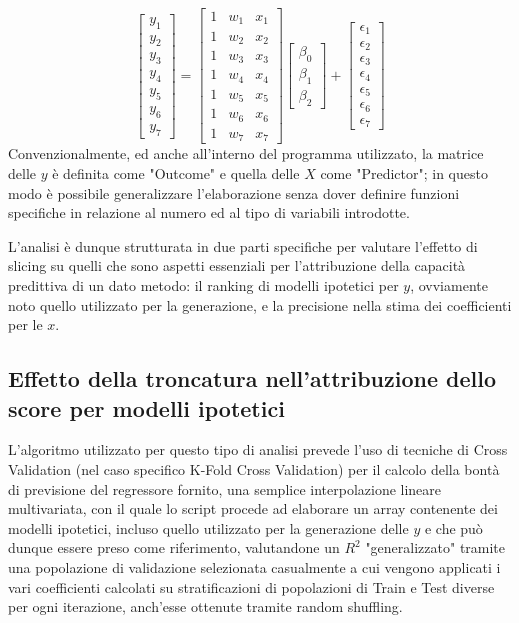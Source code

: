\documentclass[a4paper]{report}
\begin{document}
\[\begin{bmatrix}y_1 \\ y_2 \\ y_3 \\ y_4 \\ y_5 \\ y_6 \\ y_7 \end{bmatrix} =
\begin{bmatrix} 1 & w_1 & x_1  \\1 & w_2 & x_2  \\1 & w_3 & x_3  \\1 & w_4 & x_4  \\1 & w_5 & x_5  \\1 & w_6 & x_6 \\ 1& w_7  & x_7  \end{bmatrix}
\begin{bmatrix} \beta_0 \\ \beta_1 \\ \beta_2  \end{bmatrix}
+
\begin{bmatrix} \epsilon_1 \\ \epsilon_2 \\ \epsilon_3 \\ \epsilon_4 \\ \epsilon_5 \\ \epsilon_6 \\ \epsilon_7 \end{bmatrix}\]
Convenzionalmente, ed anche all'interno del programma utilizzato, la matrice delle $y$ è definita come "Outcome" e quella delle $X$ come "Predictor"; in questo modo è possibile generalizzare l'elaborazione senza dover definire funzioni specifiche in relazione al numero ed al tipo di variabili introdotte.

L'analisi è dunque strutturata in due parti specifiche per valutare l'effetto di slicing su quelli che sono aspetti essenziali per l'attribuzione della capacità predittiva di un dato metodo: il ranking di modelli ipotetici per $y$, ovviamente noto quello utilizzato per la generazione, e la precisione nella stima dei coefficienti per  le $x$.

\subsection{Effetto della troncatura nell'attribuzione dello score per modelli ipotetici}
L'algoritmo utilizzato per questo tipo di analisi prevede l'uso di tecniche di Cross Validation (nel caso specifico K-Fold Cross Validation) per il calcolo della bontà di previsione del regressore fornito,  una semplice interpolazione lineare multivariata, con il quale lo script procede ad elaborare un array contenente dei modelli ipotetici, incluso quello utilizzato per la generazione delle $y$ e che può dunque essere preso come riferimento, valutandone un $R^2$ "generalizzato" tramite una popolazione di validazione selezionata casualmente a cui vengono applicati i vari coefficienti calcolati su stratificazioni di popolazioni di Train e Test diverse per ogni iterazione, anch'esse ottenute tramite random shuffling.
\end{document}

